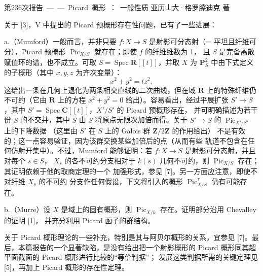 \unit{第236次报告——Picard 概形：一般性质}
%
  {亚历山大·格罗滕迪克 著}


关于 [3]，V 中提出的 Picard 预概形存在性问题，已有了一些进展：

\medskip
\noindent a.（Mumford）一般而言，并非只要
$f:X\longrightarrow S$ 是射影可分态射（= 平坦且纤维可分），Picard
预概形 $\operatorname{Pic}_{X/S}$ 就存在；即使 $f$ 的纤维维数为 1，
且 $S$ 是完备离散赋值环的谱，也不成立。可取
$S=\operatorname{Spec}\mathbf R[[t]]$，并取 $X$ 为
$\mathbf P^2_S$ 中由下式定义的子概形（其中 $x,y,z$ 为齐次变量）：
\[
x^2+y^2=tz^2,
\]
这给出一条在几何上退化为两条相交直线的二次曲线，但在域
$\mathbf R$ 上的特殊纤维仍不可约（它由 $\mathbf R$ 上的方程
$x^2+y^2=0$ 给出）。容易看出，经过平展扩张
$S'\longrightarrow S$，其中
$S'=\operatorname{Spec}\mathbf C[[t]]$，$X'/S'$ 的 Picard 预概形存在，
并可明确描述为若干份 $\widetilde S$ 的不交并，其中
$\widetilde S$ 由 $S$ 将原点无限次加倍而得。关于
$S'\longrightarrow S$ 的 $\operatorname{Pic}_{X'/S'}$ 上的下降数据
（这里由 $S'$ 在 $S$ 上的 Galois 群 $\mathbf Z/2\mathbf Z$ 的作用给出）
不是有效的；这一点容易验证，因为该群交换某些加倍后的点（从而有些
轨道不包含在任何仿射开集中）。不过，Mumford 能够证明：若
$f:X\longrightarrow S$ 是射影可分态射，并且对每个 $s\in S$，
$X_s$ 的各不可约分支相对于 $k(s)$ 几何不可约，则
$\operatorname{Pic}_{X/S}$ 存在；其证明依赖于他的取商定理的一个
加强形式，参见 [7]。另一方面应注意，即使不对纤维 $X_s$ 的不可约
分支作任何假设，下文将引入的概形
$\operatorname{Pic}^{\tau}_{X/S}$ 仍有可能存在。

\noindent b.（Murre）设 $X$ 是域上的固有概形，则
$\operatorname{Pic}_{X/k}$ 存在。证明部分沿用 Chevalley 的证明 [1]，
并充分利用 Picard 函子的群结构。

关于 Picard 概形理论的一些补充，特别是其与阿贝尔概形的关系，宜参见
[7]。最后，本篇报告的一个显著缺陷，是没有给出把一个射影概形的
Picard 概形同其超平面截面的 Picard 概形进行比较的“等价判据”；
发展这类判据所需的关键定理见 [5]，再加上 Picard 概形的存在性定理。


